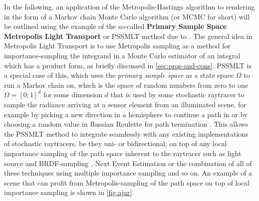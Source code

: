 \documentclass[oneside, a4paper]{article}
\begin{document}
In the following, an application of the Metropolis-Hastings algorithm to rendering in the form of a Markov chain Monte Carlo algorithm (or MCMC for short) will be outlined using the example of the so-called \textbf{Primary Sample Space Metropolis Light Transport} or PSSMLT method due to \autocite[Kelemen, Szirmay-Kalos, Antal and Csonka (2002)]{pssmlt}. The general idea in Metropolis Light Transport is to use Metropolis sampling as a method for importance-sampling the integrand in a Monte Carlo estimator of an integral which has a product form, as briefly discussed in \autoref{sec:pros-and-cons}. PSSMLT is a special case of this, which uses the \textit{primary sample space} as a state space $\Omega$ to run a Markov chain on, which is the space of random numbers from zero to one $\Omega = [0;1]^d$ for some dimension $d$ that is used by some stochastic raytracer to sample the radiance arriving at a sensor element from an illuminated scene, for example by picking a new direction in a hemisphere to continue a path in or by choosing a random value in Russian Roulette for path termination \autocite{pssmlt}. This allows the PSSMLT method to integrate seamlessly with any existing implementations of stochastic raytracers, be they uni- or bidirectional, on top of any local importance sampling of the path space inherent to the raytracer such as light source and BRDF-sampling \autocite{pssmlt}, Next Event Estimation or the combination of all of these techniques using multiple importance sampling and so on. An example of a scene that can profit from Metropolis-sampling of the path space on top of local importance sampling is shown in \autoref{fig:ajar}.\\
\end{document}
